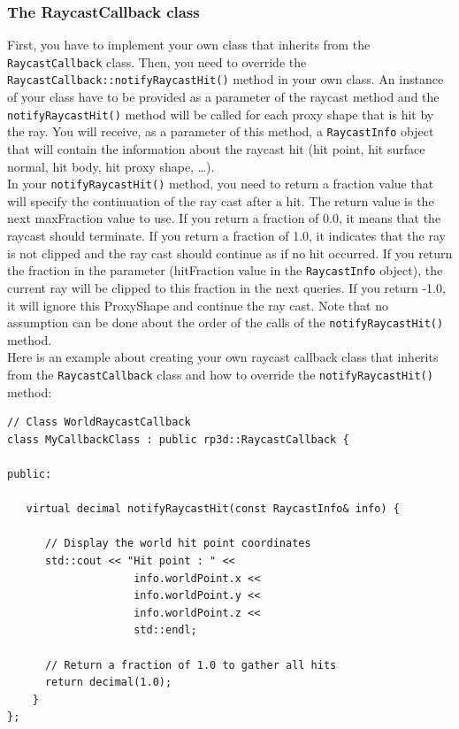 \documentclass[a4paper,12pt]{article}
\begin{document}
    \subsubsection{The RaycastCallback class}

    First, you have to implement your own class that inherits from the \texttt{RaycastCallback} class. Then, you need to override the
    \texttt{RaycastCallback::notifyRaycastHit()} method in your own class. An instance of your class have to be provided as a parameter
    of the raycast method and the \texttt{notifyRaycastHit()} method will be called for each proxy shape that is hit by the ray. You will receive, as a parameter
    of this method, a \texttt{RaycastInfo} object that will contain the information about the raycast hit (hit point, hit surface normal, hit body, hit proxy shape, \dots). \\

    In your \texttt{notifyRaycastHit()} method, you need to return a fraction value that will specify the continuation of the ray cast after a hit.
    The return value is the next maxFraction value to use. If you return a fraction of 0.0, it means that the raycast should terminate. If you return a
    fraction of 1.0, it indicates that the ray is not clipped and the ray cast should continue as if no hit occurred. If you return the fraction in the
    parameter (hitFraction value in the \texttt{RaycastInfo} object), the current ray will be clipped to this fraction in the next queries. If you return -1.0, it will
    ignore this ProxyShape and continue the ray cast. Note that no assumption can be done about the order of the calls of the \texttt{notifyRaycastHit()} method. \\

    Here is an example about creating your own raycast callback class that inherits from the \texttt{RaycastCallback} class and how to override the
    \texttt{notifyRaycastHit()} method: \\

    \begin{lstlisting}
// Class WorldRaycastCallback
class MyCallbackClass : public rp3d::RaycastCallback {

public:

   virtual decimal notifyRaycastHit(const RaycastInfo& info) {

      // Display the world hit point coordinates
      std::cout << "Hit point : " <<
                    info.worldPoint.x <<
                    info.worldPoint.y <<
                    info.worldPoint.z <<
                    std::endl;

      // Return a fraction of 1.0 to gather all hits
      return decimal(1.0);
    }
};
  \end{lstlisting}
\end{document}
